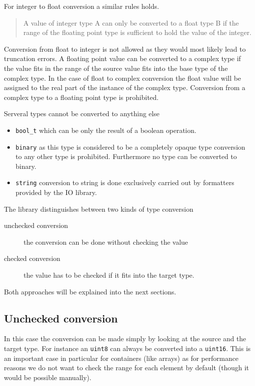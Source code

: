 For integer to float conversion a similar rules holds. 
\begin{quote}
    A value of integer type A can only be converted to a float type B
    if the range of the floating point type is sufficient to hold the 
    value of the integer.
\end{quote}
Conversion from float to integer is not allowed as they would most 
likely lead to truncation errors. 
A floating point value can be converted to a complex type if the value fits in
the range of the source value fits into the base type of the complex type. 
In the case of float to complex conversion the float value will be 
assigned to the real part of the instance of the complex type. 
Conversion from a complex type to a floating point type is prohibited. 

Serveral types cannot be converted to anything else
\begin{itemize}
    \item \texttt{bool\_t} which can be only the result of a boolean 
        operation.
    \item \texttt{binary} as this type is considered to be a completely 
        opaque type conversion to any other type is prohibited. Furthermore no
        type can be converted to binary. 
    \item \texttt{string} conversion to string is done exclusively carried out by 
        formatters provided by the IO library. 
\end{itemize}

The library distinguishes between two kinds of type conversion
\begin{description}
    \item[unchecked conversion] the conversion can be done without checking the
        value
    \item[checked conversion] the value has to be checked if it fits into the 
        target type.
\end{description}
Both approaches will be explained into the next sections.

\subsection{Unchecked conversion}

In this case the conversion can be made simply by looking at the source and the
target type. For instance an \texttt{uint8} can always be converted into a 
\texttt{uint16}. This is an important case in particular for containers (like
arrays) as for performance reasons we do not want to check the range for each
element by default (though it would be possible manually). 

